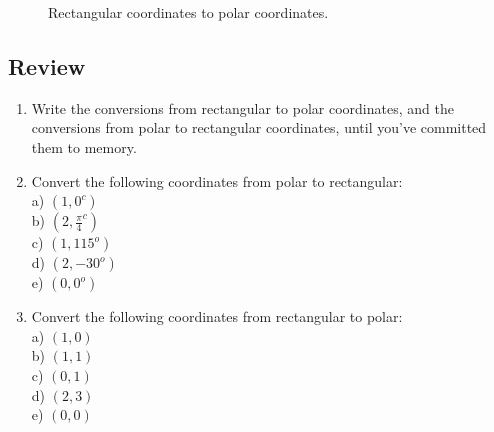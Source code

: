 \begin{figure}[htb!]
\center
\caption{Rectangular coordinates to polar coordinates.}
\label{fig:Rectangular coordinates to polar coordinates.}
\end{figure}

\subsection{Review}

\begin{enumerate}

\item{Write the conversions from rectangular to polar coordinates, and the conversions from polar to rectangular coordinates, until you've committed them to memory.}\\

\item{Convert the following coordinates from polar to rectangular:}\\

\tab a) $(1,0^c)$\\

\tab b) $(2,\frac{\pi}{4}^c)$\\

\tab c) $(1,115^o)$\\

\tab d) $(2,-30^o)$\\

\tab e) $(0,0^o)$\\

\item{Convert the following coordinates from rectangular to polar:}\\

\tab a) $(1,0)$\\

\tab b) $(1,1)$\\

\tab c) $(0,1)$\\

\tab d) $(2,3)$\\

\tab e) $(0,0)$\\

\end{enumerate}

